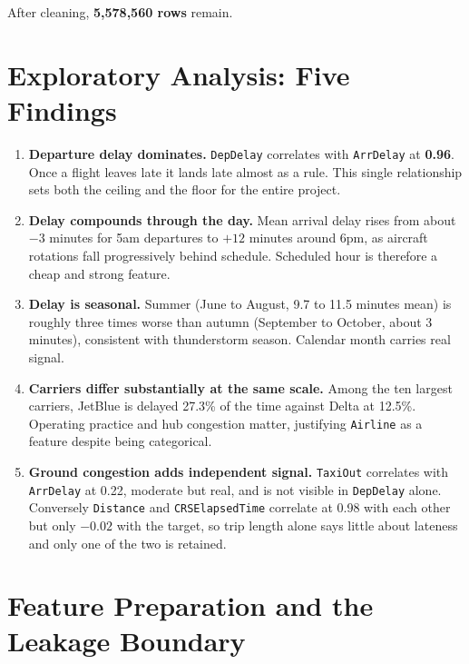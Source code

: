 \documentclass[11pt,a4paper]{article}
\newcommand{\metric}[1]{\textbf{\color{deep}#1}}
\begin{document}
After cleaning, \metric{5{,}578{,}560 rows} remain.

\section{Exploratory Analysis: Five Findings}

\begin{enumerate}[leftmargin=1.5em,itemsep=3pt]
  \item \textbf{Departure delay dominates.} \texttt{DepDelay} correlates with
        \texttt{ArrDelay} at \metric{0.96}. Once a flight leaves late it lands late
        almost as a rule. This single relationship sets both the ceiling and the floor
        for the entire project.
  \item \textbf{Delay compounds through the day.} Mean arrival delay rises from about
        $-3$ minutes for 5am departures to $+12$ minutes around 6pm, as aircraft
        rotations fall progressively behind schedule. Scheduled hour is therefore a
        cheap and strong feature.
  \item \textbf{Delay is seasonal.} Summer (June to August, 9.7 to 11.5 minutes mean)
        is roughly three times worse than autumn (September to October, about 3
        minutes), consistent with thunderstorm season. Calendar month carries real
        signal.
  \item \textbf{Carriers differ substantially at the same scale.} Among the ten largest
        carriers, JetBlue is delayed 27.3\% of the time against Delta at 12.5\%.
        Operating practice and hub congestion matter, justifying \texttt{Airline} as a
        feature despite being categorical.
  \item \textbf{Ground congestion adds independent signal.} \texttt{TaxiOut} correlates
        with \texttt{ArrDelay} at 0.22, moderate but real, and is not visible in
        \texttt{DepDelay} alone. Conversely \texttt{Distance} and
        \texttt{CRSElapsedTime} correlate at 0.98 with each other but only $-0.02$ with
        the target, so trip length alone says little about lateness and only one of the
        two is retained.
\end{enumerate}

\section{Feature Preparation and the Leakage Boundary}
\end{document}
